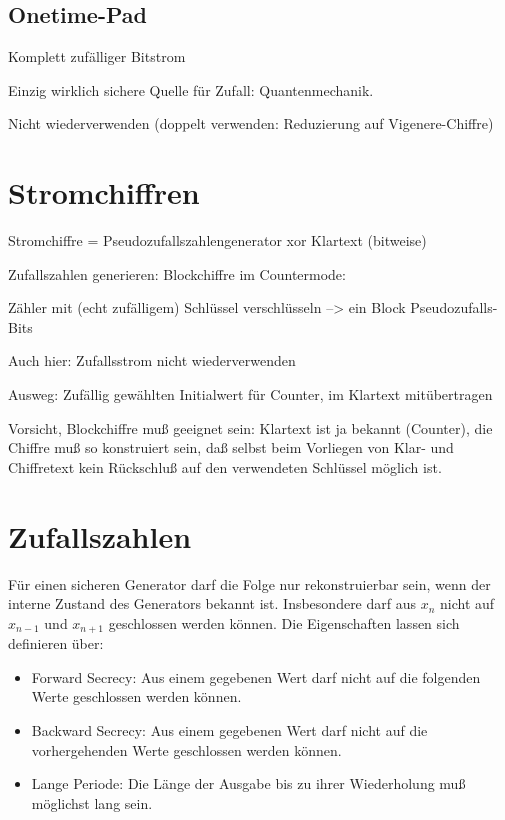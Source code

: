 \section{Onetime-Pad}

Komplett zufälliger Bitstrom

Einzig wirklich sichere Quelle für Zufall: Quantenmechanik.

Nicht wiederverwenden (doppelt verwenden: Reduzierung auf Vigenere-Chiffre)


\chapter{Stromchiffren}

Stromchiffre = Pseudozufallszahlengenerator xor Klartext (bitweise)

Zufallszahlen generieren: Blockchiffre im Countermode:

Zähler mit (echt zufälligem) Schlüssel verschlüsseln --> ein Block Pseudozufalls-Bits

Auch hier: Zufallsstrom nicht wiederverwenden

Ausweg: Zufällig gewählten Initialwert für Counter, im Klartext mitübertragen

Vorsicht, Blockchiffre muß geeignet sein: Klartext ist ja bekannt (Counter), die Chiffre muß so konstruiert sein, daß selbst beim Vorliegen von Klar- und Chiffretext kein Rückschluß auf den verwendeten Schlüssel möglich ist.


\chapter{Zufallszahlen}

Für einen sicheren Generator darf die Folge nur rekonstruierbar sein, wenn der interne Zustand des Generators bekannt ist. Insbesondere darf aus $x_n$ nicht auf $x_{n-1}$ und $x_{n+1}$ geschlossen werden können. Die Eigenschaften lassen sich definieren über:

\begin{itemize}
  \item{Forward Secrecy:} Aus einem gegebenen Wert darf nicht auf die folgenden Werte geschlossen werden können.
  \item{Backward Secrecy:} Aus einem gegebenen Wert darf nicht auf die vorhergehenden Werte geschlossen werden können.
  \item{Lange Periode:} Die Länge der Ausgabe bis zu ihrer Wiederholung muß möglichst lang sein.
\end{itemize}

